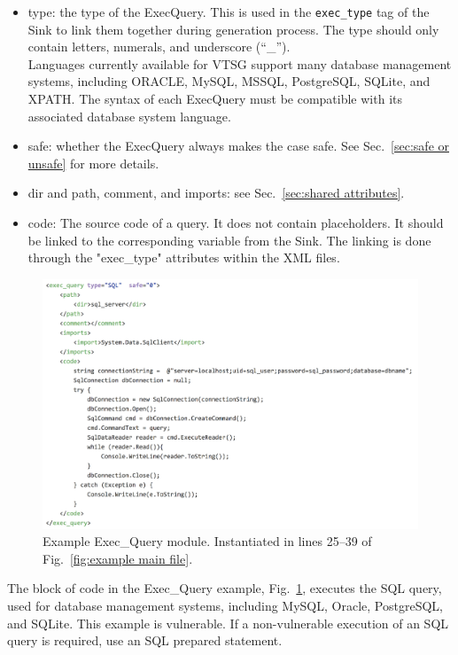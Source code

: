 \documentclass[12pt]{article}
\begin{document}
\begin{itemize}
    \item type: the type of the ExecQuery. This is used in the
    \verb|exec_type| tag of the Sink to link them together during
    generation process.  The type should only contain letters, numerals, and
    underscore (``\_'').\\
    Languages currently available for VTSG support many database management
    systems, including ORACLE, MySQL, MSSQL, PostgreSQL, SQLite, and XPATH.
    The syntax of each ExecQuery must be
    compatible with its associated database system language.
    
    \item safe: whether the ExecQuery always makes the case safe.
    See Sec.~\ref{sec:safe or unsafe} for more details.

    \item dir and path, comment, and imports: see Sec.~\ref{sec:shared attributes}.

    \item code: The source code of a query. It does not contain placeholders.
    It should be linked to the corresponding variable from the Sink. The linking is done through the "exec\_type" attributes within the XML files.
\end{itemize}


\begin{figure}[htbp]
  \includegraphics[width=\linewidth]{fig_Exec_Query_file.png}
  \caption{Example Exec\_Query module. Instantiated in lines 25--39 of
    Fig.~\ref{fig:example main file}.}
  \label{fig:example exec-query file}
\end{figure}

The block of code in the Exec\_Query example, 
Fig.~\ref{fig:example exec-query file}, executes the SQL query, used 
for database management
systems, including MySQL, Oracle, PostgreSQL, and SQLite.  This example is
vulnerable.  If a non-vulnerable execution of an SQL query is required,
use an SQL prepared statement.
\end{document}
